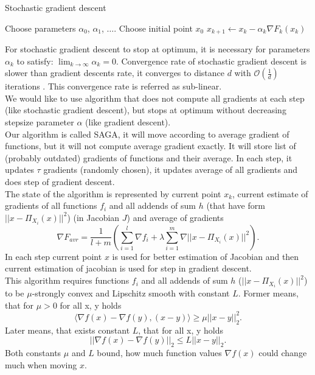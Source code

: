 \documentclass[11pt]{book}
\begin{document}
\begin{algorithm}[H]
	\caption{Stochastic gradient descent}
	\label{alg:sgd}
	\begin{algorithmic}[1]
		\State Choose parameters $\alpha_0$, $\alpha_1$, $\dots$.
		\State Choose initial point $x_0$
		\State $x_{k+1} \leftarrow x_k - \alpha_k\nabla F_k(x_k) $
		\EndFor
	\end{algorithmic}
\end{algorithm}

For stochastic gradient descent to stop at optimum, it is necessary for parameters $\alpha_k$ to satisfy: $\lim_{k \rightarrow \infty}\alpha_k=0 $. Convergence rate of stochastic gradient descent is slower than gradient descents rate, it converges to distance $d$ with $\mathcal{O}(\frac{1}{d})$ iterations \cite{SGD}. This convergence rate is referred as sub-linear.\\

We would like to use algorithm that does not compute all gradients at each step (like stochastic gradient descent), but stops at optimum without decreasing stepsize parameter $\alpha$ (like gradient descent).\\

Our algorithm is called SAGA, it will move according to average gradient of functions, but it will not compute average gradient exactly. It will store list of (probably outdated) gradients of functions and their average. In each step, it updates $\tau$ gradients (randomly chosen), it updates average of all gradients and does step of gradient descent.\\

The state of the algorithm is represented by current point $x_k$, current estimate of gradients of all functions $f_i$ and all addends of sum $h$ (that have form $||x-\Pi_{X_i}(x)||^2$) (in Jacobian $J$) and average of gradients $$\nabla F_{avr}= \frac{1}{l+m}\left( \sum_{i=1}^l \nabla f_i + \lambda\sum_{i=1}^m \nabla ||x-\Pi_{X_i}(x)||^2 \right).$$ In each step current point $x$ is used for better estimation of Jacobian and then current estimation of jacobian is used for step in gradient descent.\\

This algorithm requires functions $f_i$ and all addends of sum $h$ ($||x-\Pi_{X_i}(x)||^2$) to be $\mu$-strongly convex and Lipschitz smooth with constant $L$. Former means, that for $\mu>0$ for all x, y holds $$\langle \nabla f(x) - \nabla f(y), (x-y) \rangle \geq \mu ||x-y||_2^2. $$
Later means, that exists constant $L$, that for all x, y holds $$||\nabla f(x) - \nabla f(y)||_2 \leq L ||x-y||_2.$$ Both constants $\mu$ and $L$ bound, how much function values $\nabla f(x)$ could change much when moving $x$.
\end{document}
